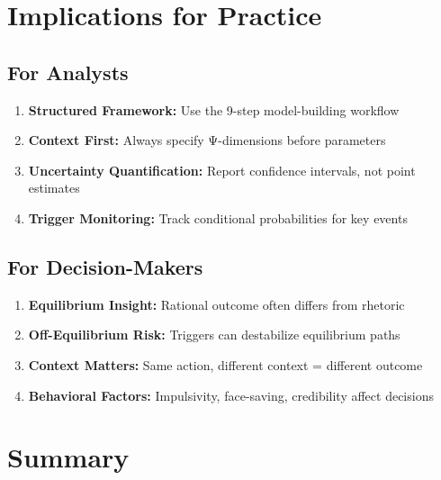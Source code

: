 
\section{Implications for Practice}
\label{sec:crisis-practice}

\subsection{For Analysts}

\begin{enumerate}
\item \textbf{Structured Framework:} Use the 9-step model-building workflow
\item \textbf{Context First:} Always specify Ψ-dimensions before parameters
\item \textbf{Uncertainty Quantification:} Report confidence intervals, not point estimates
\item \textbf{Trigger Monitoring:} Track conditional probabilities for key events
\end{enumerate}

\subsection{For Decision-Makers}

\begin{enumerate}
\item \textbf{Equilibrium Insight:} Rational outcome often differs from rhetoric
\item \textbf{Off-Equilibrium Risk:} Triggers can destabilize equilibrium paths
\item \textbf{Context Matters:} Same action, different context = different outcome
\item \textbf{Behavioral Factors:} Impulsivity, face-saving, credibility affect decisions
\end{enumerate}



\section{Summary}

